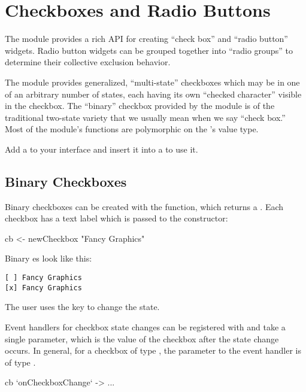 \section{Checkboxes and Radio Buttons}

The  module provides a rich API for creating ``check
box'' and ``radio button'' widgets.  Radio button widgets can be
grouped together into ``radio groups'' to determine their collective
exclusion behavior.

The  module provides generalized, ``multi-state''
checkboxes which may be in one of an arbitrary number of states, each
having its own ``checked character'' visible in the checkbox.  The
``binary'' checkbox provided by the module is of the traditional
two-state variety that we usually mean when we say ``check box.''
Most of the  module's functions are polymorphic on the
's value type.

Add a  to your interface and insert it into a
 to use it.

\subsection{Binary Checkboxes}

Binary checkboxes can be created with the  function,
which returns a .  Each checkbox has a text
label which is passed to the constructor:

\begin{haskellcode}
 cb <- newCheckbox "Fancy Graphics"
\end{haskellcode}

Binary es look like this:

\begin{verbatim}
[ ] Fancy Graphics
[x] Fancy Graphics
\end{verbatim}

The user uses the  key to change the  state.

Event handlers for checkbox state changes can be registered with
 and take a single parameter, which is the value
of the checkbox after the state change occurs.  In general, for a
checkbox of type , the parameter to the event
handler is of type .

\begin{haskellcode}
 cb `onCheckboxChange` \val ->
   ...
\end{haskellcode}

